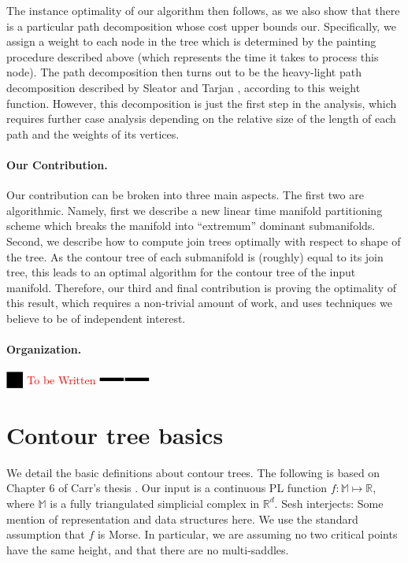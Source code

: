 \documentclass[11pt]{article}
\theoremstyle{definition}
\newcommand{\MM}{\mathbb{M}}
\newcommand{\RR}{\mathbb{R}}
\newcommand{\Reminder}[1]{{\color{red}#1}}
\newcommand{\Sesh}[1]{\Reminder{Sesh interjects: #1}}
\newcommand{\XSays}[2]{{
      {$\rule[-0.12cm]{0.2in}{0.5cm}$\fbox{\tt
            #1:} }
      \textcolor{red}{#2}
      \marginpar{\textcolor{blue}{#1}}
      {$\rule[0.1cm]{0.3in}{0.1cm}$\fbox{\tt
            end}$\rule[0.1cm]{0.3in}{0.1cm}$}
      }
   }
\newcommand{\Ben}[1]{{\XSays{Ben}{#1}}}
\begin{document}
The instance optimality of our algorithm then follows, as we also show that there is a particular path decomposition 
whose cost upper bounds our.  Specifically, we assign a weight to each node in the tree which is determined by 
the painting procedure described above (which represents the time it takes to process this node).  
The path decomposition then turns out to be the heavy-light path decomposition 
described by Sleator and Tarjan \cite{st-dsdt-83}, according to this weight function.
However, this decomposition is just the first step in the analysis, which 
requires further case analysis depending on the relative size of the length of each path 
and the weights of its vertices.

\paragraph{Our Contribution.}
Our contribution can be broken into three main aspects.  The first two are algorithmic.  Namely, 
first we describe a new linear time manifold partitioning scheme which breaks the manifold into 
``extremum'' dominant submanifolds.  
Second, we describe how to compute join trees optimally with respect to shape of the tree.
As the contour tree of each submanifold is (roughly) equal to its join tree, this leads to an 
optimal algorithm for the contour tree of the input manifold.  
Therefore, our third and final contribution is proving the optimality of this result, which 
requires a non-trivial amount of work, and uses techniques we believe to be of independent interest.

\paragraph{Organization.}
\Ben{To be Written}

\section{Contour tree basics} \label{sec:basics}

We detail the basic definitions about contour trees. The following is based on Chapter 6 of Carr's thesis \cite{c-tmi-04}.
Our input is a continuous PL function $f:\MM \mapsto \RR$, where $\MM$ is a fully triangulated simplicial complex in $\RR^d$. 
\Sesh{Some mention of representation and data structures here.}
We use the standard assumption that $f$ is Morse.  In particular, we are assuming no two critical points have the same height, 
and that there are no multi-saddles.
\end{document}
